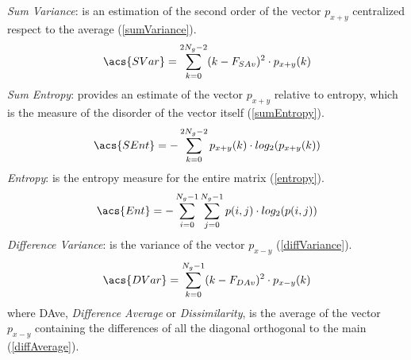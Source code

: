 \textit{Sum Variance}: is an estimation of the second order of the vector $p_{x+y}$ centralized respect to the average (\ref{sumVariance}).
\begin{equation}\label{sumVariance}
\acs{SVar}=\sum_{k=0}^{2N_{g}-2}(k - F_{SAv})^2 \cdot p_{x+y}(k)
\end{equation}
\textit{Sum Entropy}: provides an estimate of the vector $p_{x+y}$ relative to entropy, which is the measure of the disorder of the vector itself (\ref{sumEntropy}).
\begin{equation}\label{sumEntropy}
\acs{SEnt}=-\sum_{k=0}^{2N_{g}-2}p_{x+y}(k)\cdot log_2(p_{x+y}(k))
\end{equation}
\textit{Entropy}: is the entropy measure for the entire matrix (\ref{entropy}).
\begin{equation}\label{entropy}
\acs{Ent}=-\sum_{i=0}^{N_{g}-1}\sum_{j=0}^{N_{g}-1} p(i,j)\cdot log_2(p(i,j))
\end{equation}
\textit{Difference Variance}: is the variance of the vector $p_{x-y}$ (\ref{diffVariance}).
\begin{equation}\label{diffVariance}
\acs{DVar}=\sum_{k=0}^{N_{g}-1}(k - F_{DAv})^2 \cdot p_{x-y}(k)
\end{equation}
where \acs{DAve}, \textit{Difference Average} or \textit{Dissimilarity}, is the average of the vector $p_{x-y}$ containing the differences of all the diagonal orthogonal to the main (\ref{diffAverage}).

